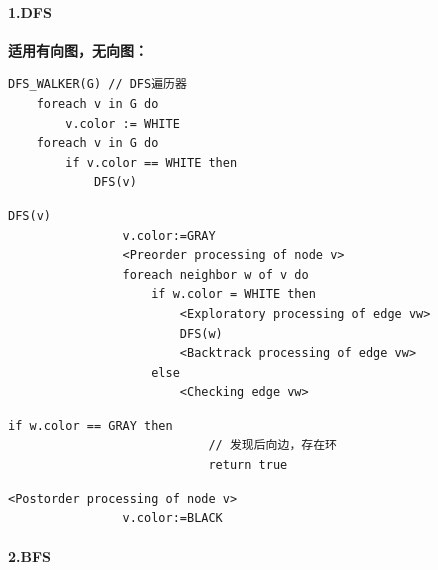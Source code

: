 \documentclass{article}
\begin{document}
\paragraph{1.DFS\\}

\textbf{适用有向图，无向图：\\}

\begin{lstlisting}[style=algorithm]
    DFS_WALKER(G) // DFS遍历器
    foreach v in G do
        v.color := WHITE
    foreach v in G do
        if v.color == WHITE then
            DFS(v)
\end{lstlisting}

\begin{lstlisting}[style=algorithmPPT]
            DFS(v)
                v.color:=GRAY
                <Preorder processing of node v>
                foreach neighbor w of v do
                    if w.color = WHITE then
                        <Exploratory processing of edge vw>
                        DFS(w)
                        <Backtrack processing of edge vw>              
                    else
                        <Checking edge vw>
                \end{lstlisting}  

\begin{lstlisting}[style=algorithm]
                        if w.color == GRAY then
                            // 发现后向边，存在环
                            return true
                        \end{lstlisting}

\begin{lstlisting}[style=algorithmPPT]
                <Postorder processing of node v>
                v.color:=BLACK
            \end{lstlisting}


\pagebreak

\paragraph{2.BFS\\}
\end{document}
